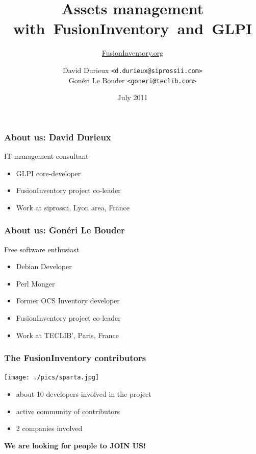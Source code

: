 \documentclass{beamer}
\title{Assets management with~FusionInventory~and~GLPI}
\author{\href{http://www.FusionInventory.org}{FusionInventory.org}}
\date{July 2011}
\institute{\texttt{[image: ./pics/rmll2011.jpg]}}
\author{ David Durieux \texttt{<d.durieux@siprossii.com>} \\
Gonéri Le Bouder \texttt{<goneri@teclib.com>}}
\begin{document}
\frame[plain]{\titlepage}

\begin{frame}
    \frametitle{About us: David Durieux}

    \begin{block}{IT management consultant}
        \begin{itemize}
        \item GLPI core-developer
        \item FusionInventory project co-leader
        \item Work at siprossii, Lyon area, France
        \end{itemize}
    \end{block}

\end{frame}



\begin{frame}
    \frametitle{About us: Gonéri Le Bouder}


    \begin{block}{Free software enthusiast}
        \begin{itemize}
        \item Debian Developer
        \item Perl Monger
        \item Former OCS Inventory developer
        \item FusionInventory project co-leader
        \item Work at TECLIB', Paris, France
        \end{itemize}
    \end{block}

\end{frame}


\begin{frame}
    \frametitle{The FusionInventory contributors}

    \begin{center}
    \texttt{[image: ./pics/sparta.jpg]}
    \end{center}

    \begin{itemize}
    \item about 10 developers involved in the project
    \item active community of contributors
    \item 2 companies involved
    \end{itemize}

    \pause
    \bf{We are looking for people to JOIN US!}
\end{frame}
\end{document}

